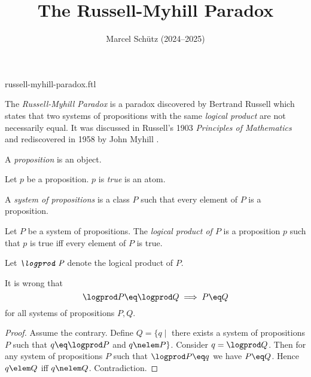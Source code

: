 \documentclass{article}
\title{The Russell-Myhill Paradox}
\author{Marcel Schütz (2024--2025)}
\date{}
\begin{document}
\begin{smodule}{russell-myhill-paradox.ftl}
\maketitle



\noindent The \emph{Russell-Myhill Paradox} is a paradox discovered by 
Bertrand Russell which states that two systems of propositions with the same 
\emph{logical product} are not necessarily equal.
It was discussed in Russell's 1903 \emph{Principles of Mathematics}
\cite[Appendix B]{Russell1903} and rediscovered in 1958 by John Myhill
\cite{Myhill1958}.

\begin{forthel}
  \begin{signature*}
    A \emph{proposition} is an object.
  \end{signature*}

  \begin{signature*}
    Let $p$ be a proposition.
    $p$ is \emph{true} is an atom.
  \end{signature*}

  \begin{definition*}
    A \emph{system of propositions} is a class $P$ such that every element of $P$ is a proposition.
  \end{definition*}

  \begin{signature*}[for=logprod]
    Let $P$ be a system of propositions.
    The \emph{logical product of $P$} is a proposition $p$ such that $p$ is true iff every element of $P$ is true.
  
  Let $\emph{\logprod P}$ denote the logical product of $P$.
  \end{signature*}
  
  \begin{theorem*}[title=Russell-Myhill Paradox,id=russell_myhill_paradox]
    It is wrong that
    \[ \logprod P \eq \logprod Q \implies P \eq Q \]
    for all systems of propositions $P, Q$.
  \end{theorem*}
  \begin{proof}
    Assume the contrary.
    Define $Q = \{q \mid$ there exists a system of propositions $P$ such that $q \eq \logprod P$ and $q \nelem P\}$.
    Consider $q = \logprod Q$.
    Then for any system of propositions $P$ such that $\logprod P \eq q$ we have $P \eq Q$.
    Hence $q \elem Q$ iff $q \nelem Q$.
    Contradiction.
  \end{proof}
\end{forthel}

\printbibliography
{}
\end{smodule}
\end{document}
